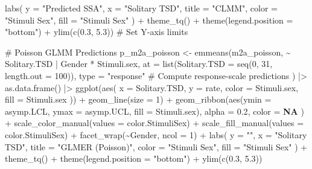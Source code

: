 \documentclass[
  bookmarksnumbered]{article}
\newenvironment{Shaded}{\begin{snugshade}}{\end{snugshade}}
\newcommand{\AttributeTok}[1]{\textcolor[rgb]{0.80,0.80,0.80}{#1}}
\newcommand{\CommentTok}[1]{\textcolor[rgb]{0.50,0.62,0.50}{#1}}
\newcommand{\ConstantTok}[1]{\textcolor[rgb]{0.86,0.64,0.64}{\textbf{#1}}}
\newcommand{\DecValTok}[1]{\textcolor[rgb]{0.86,0.86,0.80}{#1}}
\newcommand{\FloatTok}[1]{\textcolor[rgb]{0.75,0.75,0.82}{#1}}
\newcommand{\FunctionTok}[1]{\textcolor[rgb]{0.94,0.94,0.56}{#1}}
\newcommand{\NormalTok}[1]{\textcolor[rgb]{0.80,0.80,0.80}{#1}}
\newcommand{\OtherTok}[1]{\textcolor[rgb]{0.94,0.94,0.56}{#1}}
\newcommand{\SpecialCharTok}[1]{\textcolor[rgb]{0.86,0.64,0.64}{#1}}
\newcommand{\StringTok}[1]{\textcolor[rgb]{0.80,0.58,0.58}{#1}}
\begin{document}
\begin{Shaded}
\begin{Highlighting}[]
  \FunctionTok{labs}\NormalTok{(}
    \AttributeTok{y =} \StringTok{"Predicted SSA"}\NormalTok{, }\AttributeTok{x =} \StringTok{"Solitary TSD"}\NormalTok{, }\AttributeTok{title =} \StringTok{"CLMM"}\NormalTok{,}
    \AttributeTok{color =} \StringTok{"Stimuli Sex"}\NormalTok{, }\AttributeTok{fill =} \StringTok{"Stimuli Sex"}
\NormalTok{  ) }\SpecialCharTok{+}
  \FunctionTok{theme\_tq}\NormalTok{() }\SpecialCharTok{+}
  \FunctionTok{theme}\NormalTok{(}\AttributeTok{legend.position =} \StringTok{"bottom"}\NormalTok{) }\SpecialCharTok{+}
  \FunctionTok{ylim}\NormalTok{(}\FunctionTok{c}\NormalTok{(}\FloatTok{0.3}\NormalTok{, }\FloatTok{5.3}\NormalTok{)) }\CommentTok{\# Set Y{-}axis limits}

\CommentTok{\# Poisson GLMM Predictions}
\NormalTok{p\_m2a\_poisson }\OtherTok{\textless{}{-}} \FunctionTok{emmeans}\NormalTok{(m2a\_poisson, }\SpecialCharTok{\textasciitilde{}}\NormalTok{ Solitary.TSD }\SpecialCharTok{|}\NormalTok{ Gender }\SpecialCharTok{*}\NormalTok{ Stimuli.sex,}
  \AttributeTok{at =} \FunctionTok{list}\NormalTok{(}\AttributeTok{Solitary.TSD =} \FunctionTok{seq}\NormalTok{(}\DecValTok{0}\NormalTok{, }\DecValTok{31}\NormalTok{, }\AttributeTok{length.out =} \DecValTok{100}\NormalTok{)),}
  \AttributeTok{type =} \StringTok{"response"} \CommentTok{\# Compute response{-}scale predictions}
\NormalTok{) }\SpecialCharTok{|\textgreater{}}
  \FunctionTok{as.data.frame}\NormalTok{() }\SpecialCharTok{|\textgreater{}}
  \FunctionTok{ggplot}\NormalTok{(}\FunctionTok{aes}\NormalTok{(}
    \AttributeTok{x =}\NormalTok{ Solitary.TSD, }\AttributeTok{y =}\NormalTok{ rate,}
    \AttributeTok{color =}\NormalTok{ Stimuli.sex, }\AttributeTok{fill =}\NormalTok{ Stimuli.sex}
\NormalTok{  )) }\SpecialCharTok{+}
  \FunctionTok{geom\_line}\NormalTok{(}\AttributeTok{size =} \DecValTok{1}\NormalTok{) }\SpecialCharTok{+}
  \FunctionTok{geom\_ribbon}\NormalTok{(}\FunctionTok{aes}\NormalTok{(}\AttributeTok{ymin =}\NormalTok{ asymp.LCL, }\AttributeTok{ymax =}\NormalTok{ asymp.UCL, }\AttributeTok{fill =}\NormalTok{ Stimuli.sex),}
    \AttributeTok{alpha =} \FloatTok{0.2}\NormalTok{, }\AttributeTok{color =} \ConstantTok{NA}
\NormalTok{  ) }\SpecialCharTok{+}
  \FunctionTok{scale\_color\_manual}\NormalTok{(}\AttributeTok{values =}\NormalTok{ color.StimuliSex) }\SpecialCharTok{+}
  \FunctionTok{scale\_fill\_manual}\NormalTok{(}\AttributeTok{values =}\NormalTok{ color.StimuliSex) }\SpecialCharTok{+}
  \FunctionTok{facet\_wrap}\NormalTok{(}\SpecialCharTok{\textasciitilde{}}\NormalTok{Gender, }\AttributeTok{ncol =} \DecValTok{1}\NormalTok{) }\SpecialCharTok{+}
  \FunctionTok{labs}\NormalTok{(}
    \AttributeTok{y =} \StringTok{""}\NormalTok{, }\AttributeTok{x =} \StringTok{"Solitary TSD"}\NormalTok{, }\AttributeTok{title =} \StringTok{"GLMER (Poisson)"}\NormalTok{,}
    \AttributeTok{color =} \StringTok{"Stimuli Sex"}\NormalTok{, }\AttributeTok{fill =} \StringTok{"Stimuli Sex"}
\NormalTok{  ) }\SpecialCharTok{+}
  \FunctionTok{theme\_tq}\NormalTok{() }\SpecialCharTok{+}
  \FunctionTok{theme}\NormalTok{(}\AttributeTok{legend.position =} \StringTok{"bottom"}\NormalTok{) }\SpecialCharTok{+}
  \FunctionTok{ylim}\NormalTok{(}\FunctionTok{c}\NormalTok{(}\FloatTok{0.3}\NormalTok{, }\FloatTok{5.3}\NormalTok{))}


\end{Highlighting}
\end{Shaded}
\end{document}
